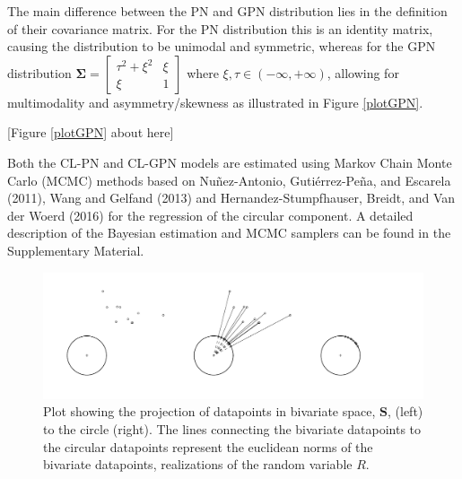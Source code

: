 \documentclass[man,mask]{apa6}
\DeclareRobustCommand{\VANDER}[3]{#2}
\begin{document}
\indent The main difference between the PN and GPN distribution lies in the
definition of their covariance matrix. For the PN distribution this is an
identity matrix, causing the distribution to be unimodal and symmetric, whereas
for the GPN distribution \(\boldsymbol{\Sigma} = \begin{bmatrix} \tau^2 + \xi^2 & \xi\\ \xi & 1 \end{bmatrix}\) where \(\xi,\tau \in (-\infty, +\infty)\),
allowing for multimodality and asymmetry/skewness as illustrated in Figure \ref{plotGPN}.

\hfil \hspace{2cm} {[}Figure \ref{plotGPN} about here{]} \hfil

\indent Both the CL-PN and CL-GPN models are estimated using Markov Chain Monte
Carlo (MCMC) methods based on Nuñez-Antonio, Gutiérrez-Peña, and Escarela (2011), Wang and Gelfand (2013) and
Hernandez-Stumpfhauser, Breidt, and \VANDER{Woerd}{Van der}{van der} Woerd (2016) for the regression of the circular component. A detailed
description of the Bayesian estimation and MCMC samplers can be found in the
Supplementary Material.

\begin{figure}
\centering
\includegraphics[width = \textwidth]{Plots/plotprojecting.pdf}
\caption{Plot showing the projection of datapoints in bivariate space, $\boldsymbol{S}$, (left) to the circle (right). The lines connecting the bivariate datapoints to the circular datapoints represent the euclidean norms of the bivariate datapoints, realizations of the random variable $R$.}
\label{projection}
\end{figure}
\end{document}
